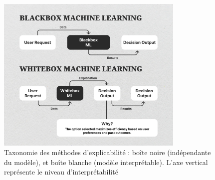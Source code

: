 \begin{figure}[h]
    \centering
    \includegraphics[width=0.8\textwidth]{My-Thesis/Chap1/images/taxonomy.png}
    \caption{Taxonomie des méthodes d'explicabilité : boîte noire (indépendante du modèle), et boîte blanche (modèle interprétable). L'axe vertical représente le niveau d'interprétabilité}
    \label{fig:taxonomie_xai}
\end{figure}

